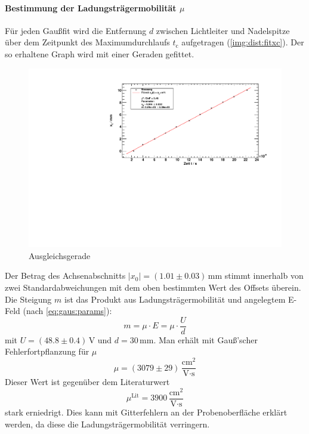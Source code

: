 \paragraph{Bestimmung der Ladungsträgermobilität $\mu$}
Für jeden Gaußfit wird die Entfernung $d$ zwischen Lichtleiter und Nadelspitze über dem Zeitpunkt des Maximumdurchlaufs $t_{\text{c}}$ 
aufgetragen (\autoref{img:dist:fitxc}). Der so erhaltene Graph wird mit einer Geraden gefittet.

\begin{figure}[H]
\begin{center}
  \includegraphics[width=\textwidth]{../img/part2/dist_fitXc.pdf}
  \caption{Ausgleichsgerade} %
  \label{img:dist:fitxc}
\end{center}
\end{figure}

Der Betrag des Achsenabschnitts $|x_0| = (1.01 \pm 0.03)$\,mm stimmt innerhalb von zwei Standardabweichungen mit dem oben bestimmten Wert des 
Offsets überein.\\
Die Steigung $m$ ist das Produkt aus Ladungsträgermobilität und angelegtem E-Feld 
(nach \autoref{eq:gaus:params}):
\begin{equation}
  \label{eq:efield}
  m = \mu \cdot E = \mu \cdot \frac{U}{d}
\end{equation}
mit $U = (48.8 \pm 0.4)$\,V und $d=30$\,mm. Man erhält mit Gauß'scher Fehlerfortpflanzung für $\mu$
\begin{equation}
  \mu = (3079 \pm 29)\,\frac{\text{cm}^2}{\text{V} \cdot \text{s}}
\end{equation}
Dieser Wert ist gegenüber dem Literaturwert
\begin{equation}
  \mu^{\text{Lit}} = 3900\,\frac{\text{cm}^2}{\text{V} \cdot \text{s}}
\end{equation}
stark erniedrigt. Dies kann mit Gitterfehlern an der Probenoberfläche erklärt werden, da diese die Ladungsträgermobilität verringern.


